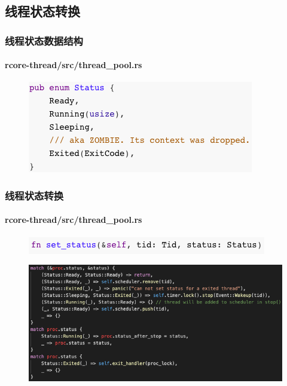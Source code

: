 \subsection{线程状态转换} %
\begin{frame}[fragile]
    \frametitle{线程状态数据结构}
    \framesubtitle{rcore-thread/src/thread\_pool.rs}
    \begin{figure}
    \includegraphics[width=0.7\linewidth]{figs/enum-Status.png}
    \end{figure}

\end{frame}
% 
% 
% 

\begin{frame}[fragile]
    \frametitle{线程状态转换}
    \framesubtitle{rcore-thread/src/thread\_pool.rs}
    \begin{figure}
    \includegraphics[width=0.6\linewidth]{figs/fn-set-status.png}
    \end{figure}

    \begin{figure}
    \includegraphics[width=0.8\linewidth]{figs/set-status.png}
    \end{figure}

\end{frame}
% 
% 
% 
% 
